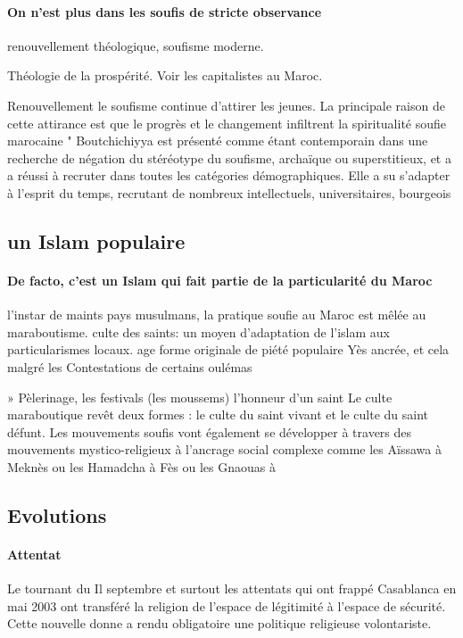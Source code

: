 \paragraph{On n'est plus dans les soufis de stricte observance} renouvellement théologique, soufisme moderne. 
\begin{Ex}
    Théologie de la prospérité. Voir les capitalistes au Maroc.
\end{Ex}


Renouvellement
  le soufisme continue d'attirer les jeunes. La principale raison de cette attirance est que le progrès et le changement infiltrent la spiritualité soufie marocaine " Boutchichiyya est présenté comme étant contemporain dans une recherche de négation du stéréotype du soufisme, archaïque ou superstitieux, et a a réussi à recruter dans toutes les catégories démographiques.
  Elle a su s'adapter à l'esprit du temps, recrutant de nombreux 
  intellectuels, universitaires, bourgeois


\subsection{un Islam populaire}



\paragraph{De facto, c'est un Islam qui fait partie de la particularité du Maroc}


l'instar de maints pays musulmans, la pratique soufie au Maroc est mêlée au maraboutisme.
  culte des saints: un moyen d'adaptation de l'islam aux particularismes locaux.
age forme originale de piété populaire
Yès ancrée, et cela malgré les
Contestations de certains oulémas

» Pèlerinage, les festivals (les moussems) l'honneur d'un saint   Le culte maraboutique revêt deux formes : le culte du saint vivant et le culte du saint défunt.
  Les mouvements soufis vont également se développer à travers des mouvements mystico-religieux à l'ancrage social complexe comme les Aïssawa à Meknès ou les Hamadcha à Fès ou les Gnaouas à

\subsection{Evolutions}

\paragraph{Attentat}
 Le tournant du Il septembre et surtout les attentats qui ont frappé Casablanca en mai 2003 ont transféré la religion de l'espace de légitimité à l'espace de sécurité.
  Cette nouvelle donne a rendu obligatoire une politique religieuse volontariste.
 
